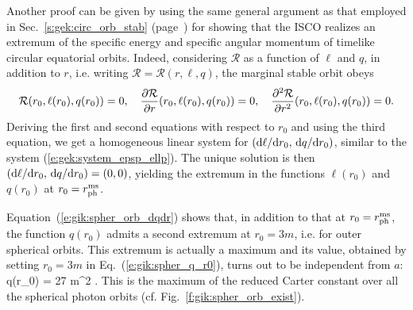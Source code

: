 \begin{remark}
Another proof can be given by using the same general argument as that employed in
Sec.~\ref{s:gek:circ_orb_stab} (page~\pageref{p:gek:ISCO_extremum_eps_ell})
for showing that the ISCO realizes an extremum of the specific energy
and specific angular momentum of timelike circular equatorial orbits.
Indeed, considering $\mathcal{R}$ as a function of $\ell$ and $q$, in addition
to $r$, i.e. writing $\mathcal{R} = \mathcal{R}(r, \ell, q)$, the marginal
stable orbit obeys
\[
    \mathcal{R}(r_0, \ell(r_0), q(r_0)) = 0,\quad
    \frac{\partial \mathcal{R}}{\partial r}(r_0, \ell(r_0), q(r_0)) = 0,\quad
    \frac{\partial^2\mathcal{R}}{\partial r^2} (r_0, \ell(r_0), q(r_0)) = 0 .
\]
Deriving the first and second equations with respect to $r_0$
and using the third equation, we get a homogeneous linear
system for $(\mathrm{d}\ell/\mathrm{d} r_0,\, \mathrm{d} q/\mathrm{d} r_0)$, similar to the
system (\ref{e:gek:system_epsp_ellp}). The unique solution
is then $(\mathrm{d}\ell/\mathrm{d} r_0,\, \mathrm{d} q/\mathrm{d} r_0) = (0, 0)$, yielding the extremum in the
functions $\ell(r_0)$ and $q(r_0)$ at $r_0 = r_{\rm ph}^{\rm ms}$.
\end{remark}

Equation~(\ref{e:gik:spher_orb_dqdr}) shows that, in addition to that
at $r_0 = r_{\rm ph}^{\rm ms}$, the function $q(r_0)$ admits
a second extremum at $r_0 = 3m$, i.e. for outer spherical orbits.
This extremum is actually a maximum and its value, obtained by
setting $r_0 = 3 m$ in Eq.~(\ref{e:gik:spher_q_r0}),
turns out to be independent from $a$:
\be \label{e:gik:spher_max_q}
    \max q(r_0) = 27 m^2 .
\ee
This is the maximum of the reduced Carter constant over all the spherical photon
orbits (cf. Fig.~\ref{f:gik:spher_orb_exist}).


